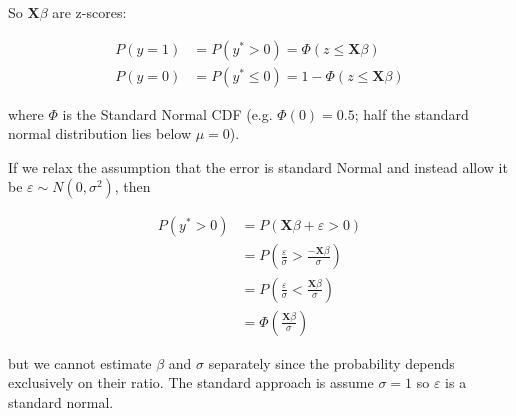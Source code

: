 \documentclass{article}
\begin{document}
So $\mathbf{X}\beta$ are z-scores:

\begin{align*}
P(y = 1) &= P(y^* > 0) = \Phi(z \leq \mathbf{X}\beta)\\
P(y = 0) &= P(y^* \leq 0) = 1 - \Phi(z \leq \mathbf{X}\beta)
\end{align*}

where $\Phi$ is the Standard Normal CDF (e.g. $\Phi(0) = 0.5$; half the standard normal distribution lies below $\mu = 0$). 

If we relax the assumption that the error is standard Normal and instead allow it be $\varepsilon \sim N(0, \sigma^2)$, then 

\begin{align*}
P(y^* > 0)  &= P(\mathbf{X}\beta + \varepsilon > 0)\\
            &= P(\frac{\varepsilon}{\sigma} > \frac{-\mathbf{X}\beta}{\sigma})\\
            &= P(\frac{\varepsilon}{\sigma} < \frac{\mathbf{X}\beta}{\sigma}) \\
            &= \Phi(\frac{\mathbf{X}\beta}{\sigma})
\end{align*}

but we cannot estimate $\beta$ and $\sigma$ separately since the probability depends exclusively on their ratio. The standard approach is assume $\sigma = 1$ so $\varepsilon$ is a standard normal. 
\end{document}
